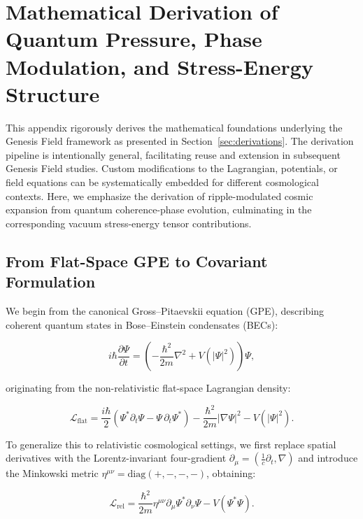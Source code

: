 \section{Mathematical Derivation of Quantum Pressure, Phase Modulation, and Stress-Energy Structure}
\label{sec:appendix_math_derivation}

This appendix rigorously derives the mathematical foundations underlying the Genesis Field framework as presented in Section~\ref{sec:derivations}. The derivation pipeline is intentionally general, facilitating reuse and extension in subsequent Genesis Field studies. Custom modifications to the Lagrangian, potentials, or field equations can be systematically embedded for different cosmological contexts. Here, we emphasize the derivation of ripple-modulated cosmic expansion from quantum coherence-phase evolution, culminating in the corresponding vacuum stress-energy tensor contributions.

\subsection{From Flat-Space GPE to Covariant Formulation}

We begin from the canonical Gross–Pitaevskii equation (GPE), describing coherent quantum states in Bose–Einstein condensates (BECs):

\begin{equation}
i\hbar\frac{\partial \Psi}{\partial t} = \left(-\frac{\hbar^2}{2m}\nabla^2 + V(|\Psi|^2)\right)\Psi,
\label{eq:gpe_original}
\end{equation}

originating from the non-relativistic flat-space Lagrangian density:

\begin{equation}
\mathcal{L}_{\text{flat}} = \frac{i\hbar}{2}\left(\Psi^*\partial_t\Psi - \Psi\,\partial_t\Psi^*\right) - \frac{\hbar^2}{2m}\left|\nabla\Psi\right|^2 - V(|\Psi|^2).
\label{eq:flat_space_lagrangian}
\end{equation}

To generalize this to relativistic cosmological settings, we first replace spatial derivatives with the Lorentz-invariant four-gradient $\partial_\mu = (\frac{1}{c}\partial_t,\nabla)$ and introduce the Minkowski metric $\eta^{\mu\nu}=\text{diag}(+,-,-,-)$, obtaining:

\begin{equation}
\mathcal{L}_{\text{rel}} = \frac{\hbar^2}{2m}\eta^{\mu\nu}\partial_\mu\Psi^*\partial_\nu\Psi - V(\Psi^*\Psi).
\label{eq:relativistic_lagrangian}
\end{equation}

